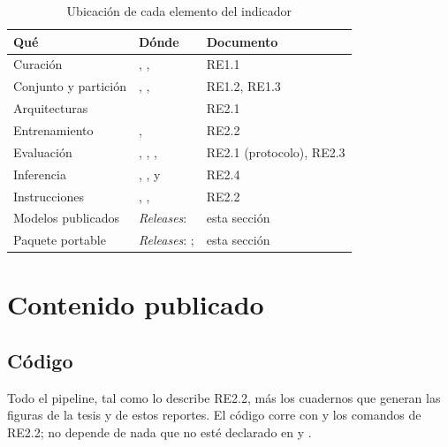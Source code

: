 \documentclass[12pt,a4paper]{article}
\begin{document}
\begin{table}[htbp]
    \centering
    \caption{Ubicación de cada elemento del indicador}
    \label{tab:donde}
    \small
    \begin{tabular}{@{}L{3.2cm}L{6.6cm}L{4.0cm}@{}}
        \toprule
        \textbf{Qué} & \textbf{Dónde} & \textbf{Documento} \\
        \midrule
        Curación & , ,  & RE1.1 \\
        Conjunto y partición & , ,  & RE1.2, RE1.3 \\
        Arquitecturas &  & RE2.1 \\
        Entrenamiento & ,  & RE2.2 \\
        Evaluación & , , ,  & RE2.1 (protocolo), RE2.3 \\
        Inferencia & , ,  y  & RE2.4 \\
        Instrucciones & , ,  & RE2.2 \\
        Modelos publicados & \emph{Releases}:  & esta sección \\
        Paquete portable & \emph{Releases}: ;  & esta sección \\
        \bottomrule
    \end{tabular}
\end{table}

\section{Contenido publicado}

\subsection{Código}

Todo el pipeline, tal como lo describe RE2.2, más los cuadernos que generan las figuras de la
tesis y de estos reportes. El código corre con  y los comandos de RE2.2; no
depende de nada que no esté declarado en  y .
\end{document}
